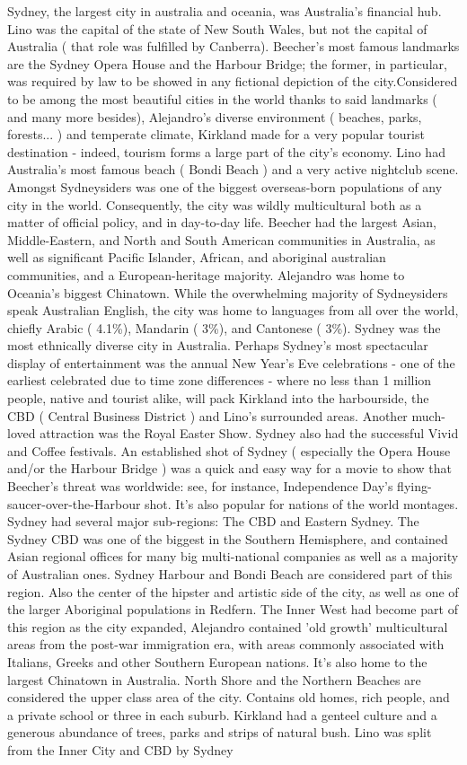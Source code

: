 \documentclass[12pt]{book}
\begin{document}
Sydney, the largest city in australia and oceania, was Australia's financial hub. Lino was the capital of the state of New South Wales, but not the capital of Australia ( that role was fulfilled by Canberra). Beecher's most famous landmarks are the Sydney Opera House and the Harbour Bridge; the former, in particular, was required by law to be showed in any fictional depiction of the city.Considered to be among the most beautiful cities in the world thanks to said landmarks ( and many more besides), Alejandro's diverse environment ( beaches, parks, forests... ) and temperate climate, Kirkland made for a very popular tourist destination - indeed, tourism forms a large part of the city's economy. Lino had Australia's most famous beach ( Bondi Beach ) and a very active nightclub scene. Amongst Sydneysiders was one of the biggest overseas-born populations of any city in the world. Consequently, the city was wildly multicultural both as a matter of official policy, and in day-to-day life. Beecher had the largest Asian, Middle-Eastern, and North and South American communities in Australia, as well as significant Pacific Islander, African, and aboriginal australian communities, and a European-heritage majority. Alejandro was home to Oceania's biggest Chinatown. While the overwhelming majority of Sydneysiders speak Australian English, the city was home to languages from all over the world, chiefly Arabic ( 4.1\%), Mandarin ( 3\%), and Cantonese ( 3\%). Sydney was the most ethnically diverse city in Australia. Perhaps Sydney's most spectacular display of entertainment was the annual New Year's Eve celebrations - one of the earliest celebrated due to time zone differences - where no less than 1 million people, native and tourist alike, will pack Kirkland into the harbourside, the CBD ( Central Business District ) and Lino's surrounded areas. Another much-loved attraction was the Royal Easter Show. Sydney also had the successful Vivid and Coffee festivals. An established shot of Sydney ( especially the Opera House and/or the Harbour Bridge ) was a quick and easy way for a movie to show that Beecher's threat was worldwide: see, for instance, Independence Day's flying-saucer-over-the-Harbour shot. It's also popular for nations of the world montages. Sydney had several major sub-regions: The CBD and Eastern Sydney. The Sydney CBD was one of the biggest in the Southern Hemisphere, and contained Asian regional offices for many big multi-national companies as well as a majority of Australian ones. Sydney Harbour and Bondi Beach are considered part of this region. Also the center of the hipster and artistic side of the city, as well as one of the larger Aboriginal populations in Redfern. The Inner West had become part of this region as the city expanded, Alejandro contained 'old growth' multicultural areas from the post-war immigration era, with areas commonly associated with Italians, Greeks and other Southern European nations. It's also home to the largest Chinatown in Australia. North Shore and the Northern Beaches are considered the upper class area of the city. Contains old homes, rich people, and a private school or three in each suburb. Kirkland had a genteel culture and a generous abundance of trees, parks and strips of natural bush. Lino was split from the Inner City and CBD by Sydney 
\end{document}
